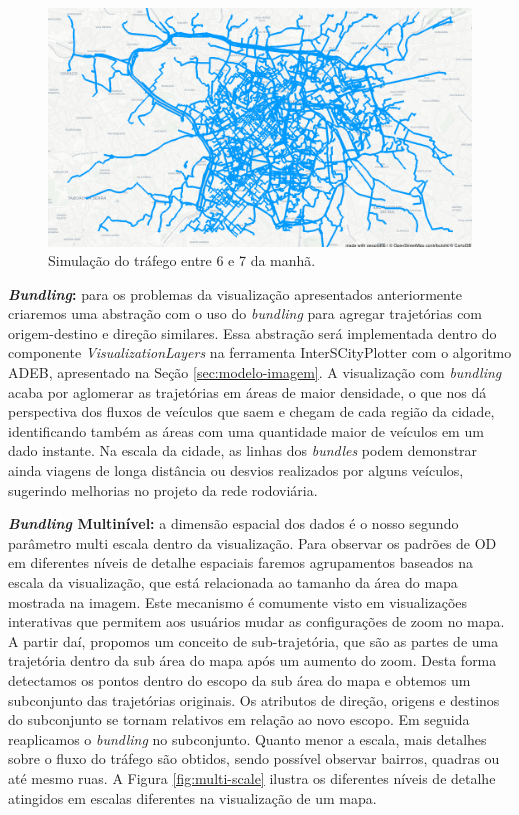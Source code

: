 \begin{figure}[!htb]
  \centering
  \includegraphics[width=1\textwidth]{../figuras/trafego-ocluso.png}
  \caption{Simulação do tráfego entre 6 e 7 da manhã.}
  \label{fig:simulated-traffic}
\end{figure}

\textbf{\emph{Bundling}:} para os problemas da visualização apresentados
anteriormente criaremos uma abstração com o uso do \emph{bundling} para agregar
trajetórias com origem-destino e direção similares. Essa abstração será
implementada dentro do componente \emph{VisualizationLayers} na ferramenta
InterSCityPlotter com o algoritmo ADEB, apresentado na Seção
\ref{sec:modelo-imagem}. A visualização com \emph{bundling} acaba por aglomerar
as trajetórias em áreas de maior densidade, o que nos dá perspectiva dos fluxos
de veículos que saem e chegam de cada região da cidade, identificando também as
áreas com uma quantidade maior de veículos em um dado instante. Na escala da
cidade, as linhas dos \emph{bundles} podem demonstrar ainda viagens de longa
distância ou desvios realizados por alguns veículos, sugerindo melhorias no
projeto da rede rodoviária.

\textbf{\emph{Bundling} Multinível:} a dimensão espacial dos dados é o nosso
segundo parâmetro multi escala dentro da visualização. Para observar os padrões
de OD em diferentes níveis de detalhe espaciais faremos agrupamentos baseados
na escala da visualização, que está relacionada ao tamanho da área do mapa
mostrada na imagem. Este mecanismo é comumente visto em visualizações
interativas que permitem aos usuários mudar as configurações de zoom no mapa. A
partir daí, propomos um conceito de sub-trajetória, que são as partes de uma
trajetória dentro da sub área do mapa após um aumento do zoom.  Desta forma
detectamos os pontos dentro do escopo da sub área do mapa e obtemos um
subconjunto das trajetórias originais. Os atributos de direção, origens e
destinos do subconjunto se tornam relativos em relação ao novo escopo. Em
seguida reaplicamos o \emph{bundling} no subconjunto. Quanto menor a escala,
mais detalhes sobre o fluxo do tráfego são obtidos, sendo possível observar bairros,
quadras ou até mesmo ruas. A Figura \ref{fig:multi-scale} ilustra os diferentes
níveis de detalhe atingidos em escalas diferentes na visualização de um mapa.

